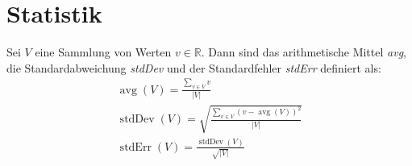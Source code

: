 \documentclass{article}
\begin{document}
\section{Statistik}
Sei $V$ eine Sammlung von Werten $v \in \mathbb{R}$. Dann sind das arithmetische Mittel \emph{avg}, die Standardabweichung \emph{stdDev} und der Standardfehler \emph{stdErr} definiert als:
\begin{gather}
\label{eq:suite_avg}
\operatorname{avg}(V) = \frac{\sum_{v \in V} v}{|V|}\\[2ex]
\label{eq:suite_stdDev}
\operatorname{stdDev}(V) = \sqrt{\frac{\sum_{v\in V} (v - \operatorname{avg}(V))^2}{|V|}}\\[2ex]
\label{eq:suite_stdErr}
\operatorname{stdErr}(V) = \frac{\operatorname{stdDev}(V)}{\sqrt{|V|}}
\end{gather}
\end{document}
